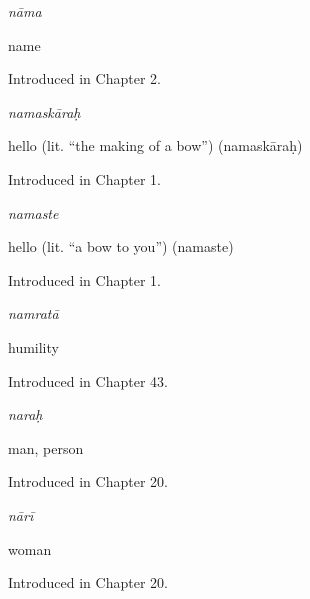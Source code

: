 \noindent\begin{minipage}[t]{\linewidth}
\raggedright
\textbf{}\enspace\emph{nāma}\par
\small name\par
\footnotesize Introduced in Chapter 2.
\end{minipage}\par\medskip

\noindent\begin{minipage}[t]{\linewidth}
\raggedright
\textbf{}\enspace\emph{namaskāraḥ}\par
\small hello (lit. \textquotedblleft{}the making of a bow\textquotedblright{}) (namaskāraḥ)\par
\footnotesize Introduced in Chapter 1.
\end{minipage}\par\medskip

\noindent\begin{minipage}[t]{\linewidth}
\raggedright
\textbf{}\enspace\emph{namaste}\par
\small hello (lit. \textquotedblleft{}a bow to you\textquotedblright{}) (namaste)\par
\footnotesize Introduced in Chapter 1.
\end{minipage}\par\medskip

\noindent\begin{minipage}[t]{\linewidth}
\raggedright
\textbf{}\enspace\emph{namratā}\par
\small humility\par
\footnotesize Introduced in Chapter 43.
\end{minipage}\par\medskip

\noindent\begin{minipage}[t]{\linewidth}
\raggedright
\textbf{}\enspace\emph{naraḥ}\par
\small man, person\par
\footnotesize Introduced in Chapter 20.
\end{minipage}\par\medskip

\noindent\begin{minipage}[t]{\linewidth}
\raggedright
\textbf{}\enspace\emph{nārī}\par
\small woman\par
\footnotesize Introduced in Chapter 20.
\end{minipage}\par\medskip

